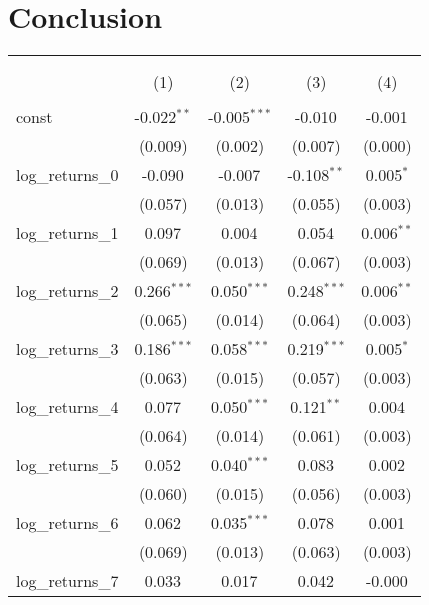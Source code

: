 \documentclass[12pt, letterpaper]{article}
\begin{document}
\section{Conclusion}





\begin{table}[H] 
    \begin{adjustbox}{width=\textwidth}
    \centering
    \begin{tabular}{@{\extracolsep{5pt}}lcccc}
    \\[-1.8ex]\hline
    \hline \\[-1.8ex]
    \\[-1.8ex] & (1) & (2) & (3) & (4) \\
    \hline \\[-1.8ex]
    const & -0.022$^{**}$ & -0.005$^{***}$ & -0.010$^{}$ & -0.001$^{}$ \\
    & (0.009) & (0.002) & (0.007) & (0.000) \\
    log\_returns\_0 & -0.090$^{}$ & -0.007$^{}$ & -0.108$^{**}$ & 0.005$^{*}$ \\
    & (0.057) & (0.013) & (0.055) & (0.003) \\
    log\_returns\_1 & 0.097$^{}$ & 0.004$^{}$ & 0.054$^{}$ & 0.006$^{**}$ \\
    & (0.069) & (0.013) & (0.067) & (0.003) \\
    log\_returns\_2 & 0.266$^{***}$ & 0.050$^{***}$ & 0.248$^{***}$ & 0.006$^{**}$ \\
    & (0.065) & (0.014) & (0.064) & (0.003) \\
    log\_returns\_3 & 0.186$^{***}$ & 0.058$^{***}$ & 0.219$^{***}$ & 0.005$^{*}$ \\
    & (0.063) & (0.015) & (0.057) & (0.003) \\
    log\_returns\_4 & 0.077$^{}$ & 0.050$^{***}$ & 0.121$^{**}$ & 0.004$^{}$ \\
    & (0.064) & (0.014) & (0.061) & (0.003) \\
    log\_returns\_5 & 0.052$^{}$ & 0.040$^{***}$ & 0.083$^{}$ & 0.002$^{}$ \\
    & (0.060) & (0.015) & (0.056) & (0.003) \\
    log\_returns\_6 & 0.062$^{}$ & 0.035$^{***}$ & 0.078$^{}$ & 0.001$^{}$ \\
    & (0.069) & (0.013) & (0.063) & (0.003) \\
    log\_returns\_7 & 0.033$^{}$ & 0.017$^{}$ & 0.042$^{}$ & -0.000$^{}$ \\

\end{tabular}
\end{adjustbox}
\end{table}
\end{document}
